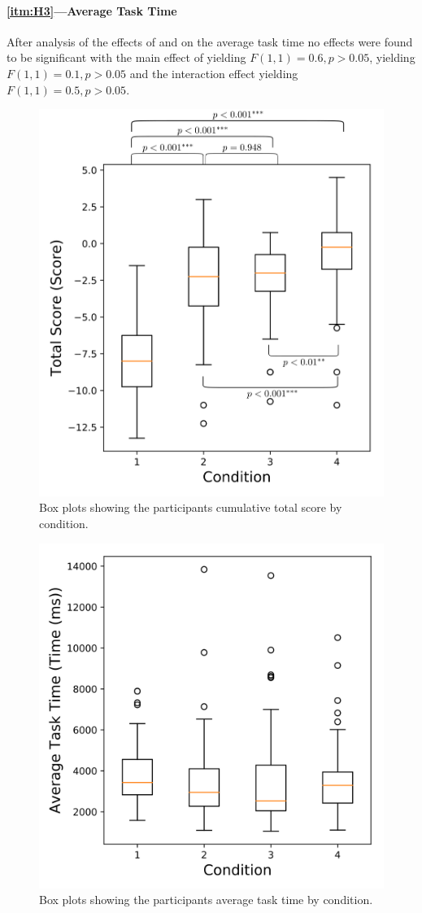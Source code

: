 \paragraph{\ref{itm:H3}---Average Task Time}
After analysis of the effects of \xQ{} and \xO{} on the average task time no effects were found to be significant with the main effect of \xQ{} yielding $F(1,1)=0.6,p>0.05$, \xO{} yielding $F(1,1)=0.1,p>0.05$ and the interaction effect yielding $F(1,1)=0.5,p>0.05$. 

       \begin{figure}[tb]
            \centering
            \includegraphics[width=0.8\linewidth]{Figures/total_score_box.png}
            \caption{Box plots showing the participants cumulative total score by condition.}
            \label{fig:score_box}
       \end{figure}
       \begin{figure}[tb]
            \centering
            \includegraphics[width=0.8\linewidth]{Figures/avg_time_box.png}
            \caption{Box plots showing the participants average task time by condition.}
            \label{fig:time_box}
       \end{figure}
